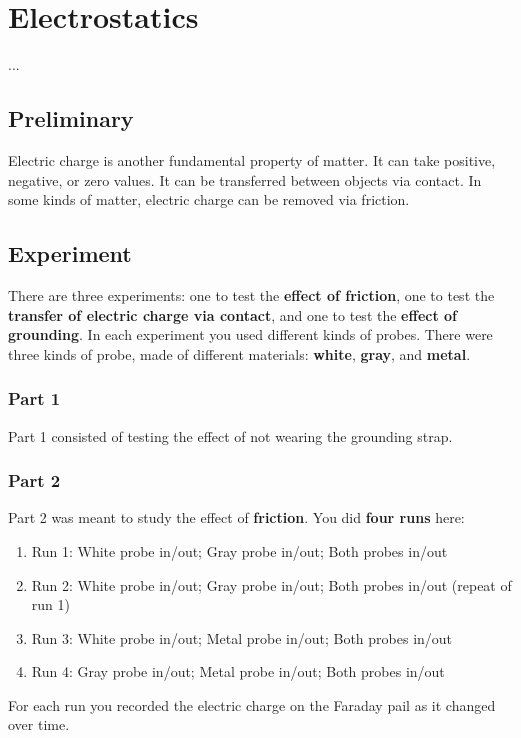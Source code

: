 \setcounter{chapter}{0}
\chapter{Electrostatics}
...
\section{Preliminary}
Electric charge is another fundamental property of matter. It can take positive, negative, or zero values. It can be transferred between objects via contact. In some kinds of matter, electric charge can be removed via friction.
\section{Experiment}
There are three experiments: one to test the \textbf{effect of friction}, one to test the \textbf{transfer of electric charge via contact}, and one to test the \textbf{effect of grounding}. In each experiment you used different kinds of probes. There were three kinds of probe, made of different materials: \textbf{white}, \textbf{gray}, and \textbf{metal}.
\subsection{Part 1}
Part 1 consisted of testing the effect of not wearing the grounding strap.
\subsection{Part 2}
Part 2 was meant to study the effect of \textbf{friction}. You did \textbf{four runs} here:
\begin{enumerate}
	\item Run 1: White probe in/out; Gray probe in/out; Both probes in/out
	\item Run 2: White probe in/out; Gray probe in/out; Both probes in/out (repeat of run 1)
	\item Run 3: White probe in/out; Metal probe in/out; Both probes in/out
	\item Run 4: Gray probe in/out; Metal probe in/out; Both probes in/out
\end{enumerate}
For each run you recorded the electric charge on the Faraday pail as it changed over time.
